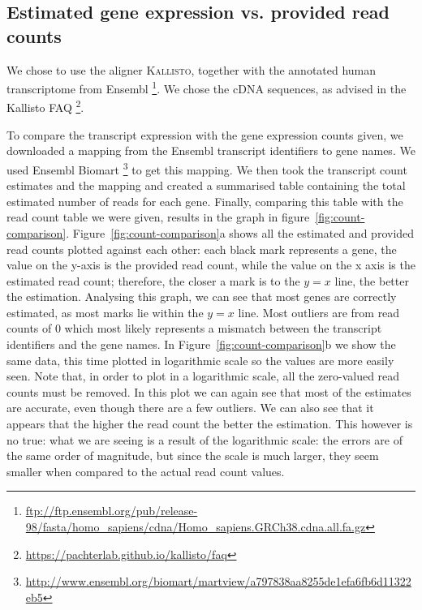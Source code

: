 \documentclass[10pt,twocolumn]{article}\usepackage[]{graphicx}\usepackage[]{color}
\newcommand{\footurl}[1]{\footnote{\url{#1}}}
\begin{document}
\subsection{Estimated gene expression vs. provided read counts}
We chose to use the aligner \textsc{Kallisto}, together with the annotated human transcriptome from Ensembl \footurl{ftp://ftp.ensembl.org/pub/release-98/fasta/homo_sapiens/cdna/Homo_sapiens.GRCh38.cdna.all.fa.gz}.
We chose the cDNA sequences, as advised in the Kallisto FAQ \footurl{https://pachterlab.github.io/kallisto/faq}.

To compare the transcript expression with the gene expression counts given, we downloaded a mapping from the Ensembl transcript identifiers to gene names. We used  Ensembl Biomart \footurl{http://www.ensembl.org/biomart/martview/a797838aa8255de1efa6fb6d11322eb5} to get this mapping. We then took the transcript count estimates and the mapping and created a summarised table containing the total estimated number of reads for each gene. Finally, comparing this table with the read count table we were given, results in the graph in figure~\ref{fig:count-comparison}. Figure~\ref{fig:count-comparison}a shows all the estimated and provided read counts plotted against each other: each black mark represents a gene, the value on the y-axis is the provided read count, while the value on the x axis is the estimated read count; therefore, the closer a mark is to the \(y=x\) line, the better the estimation. Analysing this graph, we can see that most genes are correctly estimated, as most marks lie within the \(y=x\) line. Most outliers are from read counts of 0 which most likely represents a mismatch between the transcript identifiers and the gene names. In Figure~\ref{fig:count-comparison}b we show the same data, this time plotted in logarithmic scale so the values are more easily seen. Note that, in order to plot in a logarithmic scale, all the zero-valued read counts must be removed. In this plot we can again see that most of the estimates are accurate, even though there are a few outliers. We can also see that it appears that the higher the read count the better the estimation. This however is no true: what we are seeing is a result of the logarithmic scale: the errors are of the same order of magnitude, but since the scale is much larger, they seem smaller when compared to the actual read count values.
\end{document}
